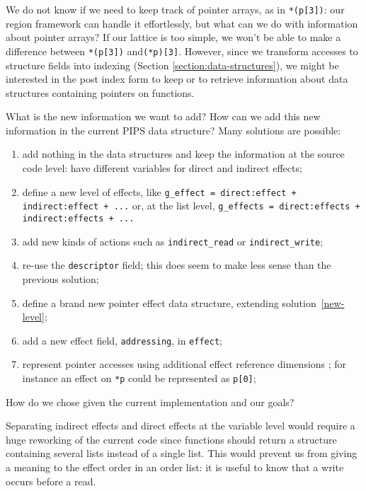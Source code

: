 \documentclass[a4paper]{report}
\begin{document}
We do not know if we need to keep track of pointer arrays, as in
 \verb/*(p[3])/: our region framework can handle it effortlessly, but
 what can we do with information about pointer arrays? If our lattice
 is too simple, we won't be able to make a difference between
 \verb/*(p[3])/ and\verb/(*p)[3]/. However, since we transform
 accesses to structure fields into indexing (Section
 \ref{section:data-structures}), we might be interested in the post
 index form to keep or to retrieve information about data structures
 containing pointers on functions.

What is the new information we want to add? How can we add this new
information in the current PIPS data structure? Many solutions are
possible:
\begin{enumerate}

\item \label{variable-level}add nothing in the data structures and
 keep the information at the source code level: have different
 variables for direct and indirect effects;

\item \label{new-level}define a new level of effects, like
\verb/g_effect = direct:effect + indirect:effect + .../ or, at the list
level, \verb/g_effects = direct:effects + indirect:effects + .../

\item \label{new-action}add new kinds of actions such as
 \verb/indirect_read/ or \verb/indirect_write/;

\item re-use the \verb/descriptor/ field; this does seem to make less
 sense than the previous solution;

\item \label{new-effect}define a brand new pointer effect data structure, extending
 solution~\ref{new-level};

\item \label{new-effect-field} add a new effect field, \verb/addressing/,
 in \verb/effect/;

\item \label{new-effect-reference-dimension} represent pointer accesses using additional effect reference dimensions ; for instance an effect on \verb/*p/ could be represented as \verb/p[0]/;

\end{enumerate}

How do we chose given the current implementation and our goals?

Separating indirect effects and direct effects at the variable level
 would require a huge reworking of the current code since functions
 should return a structure containing several lists instead of a
 single list. This would prevent us from giving a meaning to the
 effect order in an order list: it is useful to know that a write
 occurs before a read.
\end{document}
